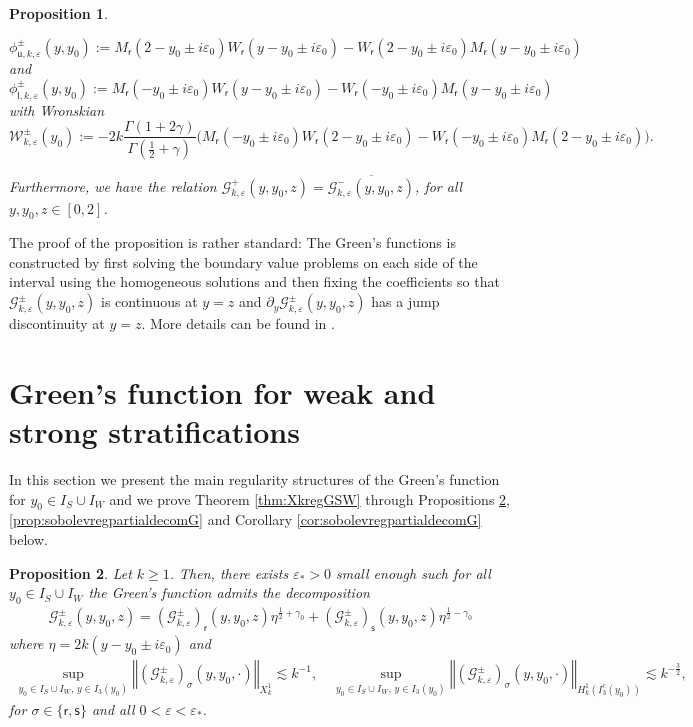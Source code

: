 \documentclass[11pt,reqno]{amsproc}
\newtheorem{proposition}{Proposition}[section]
\theoremstyle{definition}
\numberwithin{equation}{section}
\newcommand{\G}{{\mathcal{G}}}
\newcommand{\sr}{{\mathsf{r}}}
\newcommand{\s}{{\mathsf{s}}}
\newcommand{\su}{{\mathsf{u}}}
\renewcommand{\sl}{{\mathsf{l}}}
\newcommand{\W}{{\mathcal{W}}}
\newcommand{\ep}{\varepsilon}
\begin{document}
\begin{proposition}
\begin{itemize}
\begin{equation}
\phi_{\su,k,\ep}^\pm(y,y_0):=M_\sr(2 - y_0\pm i\ep_0)W_\sr(y- y_0\pm i\ep_0) - W_\sr(2 - y_0\pm i\ep_0)M_\sr(y-y_0\pm i\ep_0)
\end{equation}
and
\begin{equation}\label{eq:homolowms}
\phi_{\sl,k,\ep}^\pm(y,y_0):=M_\sr(- y_0\pm i\ep_0)W_\sr(y- y_0\pm i\ep_0) - W_\sr( - y_0\pm i\ep_0)M_\sr(y-y_0\pm i\ep_0)
\end{equation}
with Wronskian 
\begin{equation}\label{eq:def Wronskianms}
\W_{k,\ep}^\pm(y_0):= -2k\frac{\Gamma(1+2\gamma)}{\Gamma \left( \frac12 + \gamma \right)} \Big( M_\sr( - y_0\pm i\ep_0)W_\sr(2-y_0\pm i\ep_0) - W_\sr( - y_0\pm i\ep_0)M_\sr(2-y_0\pm i\ep_0) \Big).
\end{equation} 
\end{itemize}
Furthermore, we have the relation $\G_{k,\ep}^+(y,y_0,z)=\overline{\G_{k,\ep}^-(y,y_0,z)}$, for all $y,y_0,z\in[0,2]$.
\end{proposition}

The proof of the proposition is rather standard: The Green's functions is constructed by first solving the boundary value problems on each side of the interval using the homogeneous solutions and then fixing the coefficients so that $\G_{k,\ep}^\pm(y,y_0,z)$ is continuous at $y=z$ and  $\partial_y\G_{k,\ep}^\pm(y,y_0,z)$ has a jump discontinuity at $y=z$. More details can be found in  \cite{CZN25chan}.


\section{Green's function for weak and strong stratifications}\label{sec:GreensWS}
In this section we present the main regularity structures of the Green's function for $y_0\in I_S\cup I_W$ and we prove Theorem \ref{thm:XkregGSW} through Propositions \ref{prop:sobolevregdecomG}, \ref{prop:sobolevregpartialdecomG} and Corollary \ref{cor:sobolevregpartialdecomG} below.

\begin{proposition}\label{prop:sobolevregdecomG}
Let $k\geq 1$. Then, there exists $\ep_*>0$ small enough such for all $y_0\in I_S\cup I_W$ the Green's function admits the decomposition
\begin{align*}
\G_{k,\ep}^\pm(y,y_0,z) = \left( \G_{k,\ep}^\pm\right)_\sr(y,y_0,z) \eta^{\frac12 + \gamma_0} + \left( \G_{k,\ep}^\pm\right)_\s(y,y_0,z) \eta^{\frac12 - \gamma_0}
\end{align*}
where $\eta=2k(y-y_0\pm i\ep_0)$ and
\begin{align*}
\sup_{y_0\in I_S\cup I_W, \, y\in I_3(y_0)} \left\Vert \left( \G_{k,\ep}^\pm\right)_\sigma(y,y_0,\cdot) \right\Vert_{X_k^1} \lesssim k^{-1}, \quad \sup_{y_0\in I_S\cup I_W, \, y\in I_3(y_0)} \left\Vert \left( \G_{k,\ep}^\pm\right)_\sigma(y,y_0,\cdot) \right\Vert_{H_k^1(I_3^c(y_0))} \lesssim k^{-\frac32},
\end{align*}
for $\sigma\in \lbrace \sr, \s \rbrace$ and all $0<\ep< \ep_*$.
\end{proposition}
\end{document}
